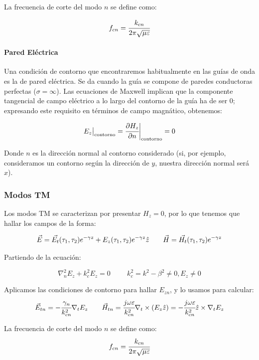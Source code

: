 \documentclass[12pt]{article}
\begin{document}
La frecuencia de corte del modo $n$ se define como:

$$f_{cn} = \cfrac{k_{cn}}{2\pi\sqrt{\mu\varepsilon}}$$

\paragraph{Pared El\'ectrica}

Una condici\'on de contorno que encontraremos habitualmente en las gu\'ias de onda es la de pared el\'ectrica. Se da cuando la gu\'ia se compone de paredes conductoras perfectas ($\sigma = \infty$). Las ecuaciones de Maxwell implican que la componente tangencial de campo el\'ectrico a lo largo del contorno de la gu\'ia ha de ser 0; expresando este requisito en t\'erminos de campo magn\'atico, obtenemos:

$$E_z\big|_{\text{contorno}} = \cfrac{\partial H_z}{\partial n}\bigg|_{\text{contorno}} = 0$$

Donde $n$ es la direcci\'on normal al contorno considerado (si, por ejemplo, consideramos un contorno seg\'un la direcci\'on de $y$, nuestra direcci\'on normal ser\'a $x$).

\subsubsection{Modos TM}

Los modos TM se caracterizan por presentar $H_z = 0$, por lo que tenemos que hallar los campos de la forma:

$$\vec{E} = \vec{E_t}(\tau_1,\tau_2) e^{-\gamma z} + E_z(\tau_1,\tau_2) e^{-\gamma z}\hat{z}
\hspace{7mm}
\vec{H} = \vec{H_t}(\tau_1,\tau_2) e^{-\gamma z}$$

Partiendo de la ecuaci\'on:

$$\nabla^2 _n E_z + k_c^2E_z = 0 \hspace{1cm} k_c^2 = k^2 - \beta^2 \neq 0, E_z \neq 0$$

Aplicamos las condiciones de contorno para hallar $E_{zn}$, y lo usamos para calcular:
$$\vec{E}_{tn} = -\cfrac{\gamma_n}{k^2_{cn}}\nabla_t E_z
\hspace{7mm}
\vec{H}_{tn} = \cfrac{j\omega\varepsilon}{k^2_{cn}}\nabla_t \times (E_z \hat{z}) = -\cfrac{j\omega\varepsilon}{k^2_{cn}}\hat{z}\times\nabla_t E_z$$



La frecuencia de corte del modo $n$ se define como:
$$f_{cn} = \cfrac{k_{cn}}{2\pi\sqrt{\mu\varepsilon}}$$
\end{document}
